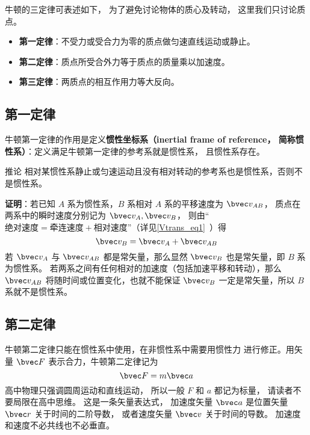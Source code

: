 

牛顿的三定律可表述如下， 为了避免讨论物体的质心及转动， 这里我们只讨论质点。
\begin{itemize}
\item \textbf{第一定律}：不受力或受合力为零的质点做匀速直线运动或静止。
\item \textbf{第二定律}：质点所受合外力等于质点的质量乘以加速度。
\item \textbf{第三定律}：两质点的相互作用力等大反向。
\end{itemize}

\subsection{第一定律}

牛顿第一定律的作用是定义\textbf{惯性坐标系（inertial frame of reference， 简称惯性系）}：定义满足牛顿第一定律的参考系就是惯性系， 且惯性系存在。

\begin{corollary}{推论}
相对某惯性系静止或匀速运动且没有相对转动的参考系也是惯性系，否则不是惯性系。
\end{corollary}
\textbf{证明}：若已知 $A$ 系为惯性系，$B$ 系相对 $A$ 系的平移速度为 $\bvec v_{AB}$， 质点在两系中的瞬时速度分别记为 $\bvec v_A, \bvec v_B$， 则由“$\text{绝对速度} = \text{牵连速度} + \text{相对速度}$”（详见\autoref{Vtrans_eq1}~）得
\begin{equation}
\bvec v_{B} = \bvec v_{A} + \bvec v_{AB}
\end{equation}
若 $\bvec v_{A}$ 与 $\bvec v_{AB}$ 都是常矢量，那么显然 $\bvec v_{B}$ 也是常矢量，即 $B$ 系为惯性系。 若两系之间有任何相对的加速度（包括加速平移和转动），那么 $\bvec v_{AB}$ 将随时间或位置变化，也就不能保证 $\bvec v_B$ 一定是常矢量，所以 $B$ 系就不是惯性系。


\subsection{第二定律}
牛顿第二定律只能在惯性系中使用，在非惯性系中需要用惯性力 进行修正。用矢量 $\bvec F$ 表示合力，牛顿第二定律记为
\begin{equation}\label{New3_eq1}
\bvec F = m\bvec a
\end{equation}
高中物理只强调圆周运动和直线运动， 所以一般 $F$ 和 $a$ 都记为标量， 请读者不要局限在高中思维。 这是一条矢量表达式， 加速度矢量 $\bvec a$ 是位置矢量 $\bvec r$ 关于时间的二阶导数， 或者速度矢量 $\bvec v$ 关于时间的导数。 加速度和速度不必共线也不必垂直。

